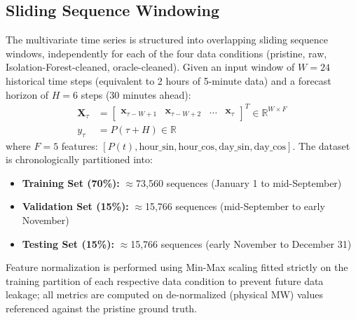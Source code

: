 \documentclass[conference]{IEEEtran}
\begin{document}
\subsection{Sliding Sequence Windowing}
The multivariate time series is structured into overlapping sliding sequence windows, independently for each of the four data conditions (pristine, raw, Isolation-Forest-cleaned, oracle-cleaned). Given an input window of $W=24$ historical time steps (equivalent to 2 hours of 5-minute data) and a forecast horizon of $H=6$ steps (30 minutes ahead):
\begin{align}
\mathbf{X}_\tau &= \begin{bmatrix} \mathbf{x}_{\tau-W+1} & \mathbf{x}_{\tau-W+2} & \dots & \mathbf{x}_\tau \end{bmatrix}^T \in \mathbb{R}^{W \times F} \\
y_\tau &= P(\tau + H) \in \mathbb{R}
\end{align}
where $F=5$ features: $[P(t), \text{hour\_sin}, \text{hour\_cos}, \text{day\_sin}, \text{day\_cos}]$. The dataset is chronologically partitioned into:
\begin{itemize}
    \item \textbf{Training Set (70\%):} $\approx$73{,}560 sequences (January 1 to mid-September)
    \item \textbf{Validation Set (15\%):} $\approx$15{,}766 sequences (mid-September to early November)
    \item \textbf{Testing Set (15\%):} $\approx$15{,}766 sequences (early November to December 31)
\end{itemize}
Feature normalization is performed using Min-Max scaling fitted strictly on the training partition of each respective data condition to prevent future data leakage; all metrics are computed on de-normalized (physical MW) values referenced against the pristine ground truth.
\end{document}
